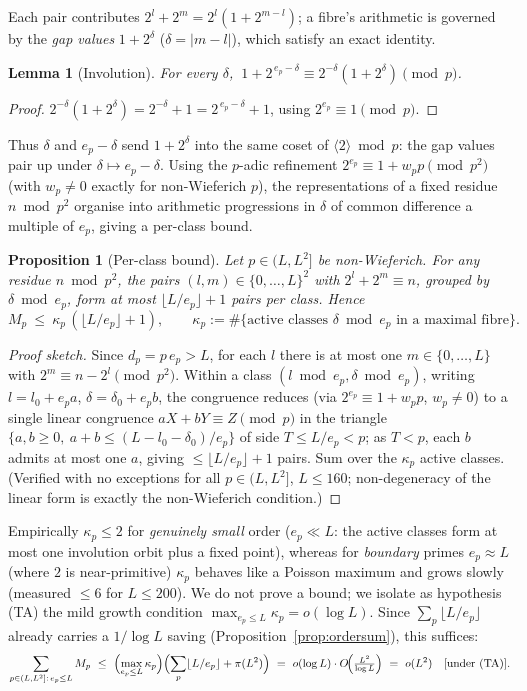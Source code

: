 \documentclass[11pt]{article}
\theoremstyle{plain}
\newtheorem{lemma}[theorem]{Lemma}
\newtheorem{proposition}[theorem]{Proposition}
\theoremstyle{definition}
\theoremstyle{remark}
\newcommand{\dpp}{d_p}
\newcommand{\ep}{e_p}
\begin{document}
Each pair contributes $2^l+2^m=2^l(1+2^{m-l})$; a fibre's arithmetic is governed
by the \emph{gap values} $1+2^\delta$ ($\delta=|m-l|$), which satisfy an exact
identity.

\begin{lemma}[Involution]\label{lem:involution}
For every $\delta$, $\ 1+2^{\,\ep-\delta}\equiv2^{-\delta}(1+2^\delta)\pmod p$.
\end{lemma}
\begin{proof}
$2^{-\delta}(1+2^\delta)=2^{-\delta}+1=2^{\,\ep-\delta}+1$, using $2^{\ep}\equiv1
\pmod p$.
\end{proof}

Thus $\delta$ and $\ep-\delta$ send $1+2^\delta$ into the same coset of
$\langle2\rangle\bmod p$: the gap values pair up under $\delta\mapsto\ep-\delta$.
Using the $p$-adic refinement $2^{\ep}\equiv1+w_pp\pmod{p^2}$ (with $w_p\ne0$
exactly for non-Wieferich $p$), the representations of a fixed residue $n\bmod
p^2$ organise into arithmetic progressions in $\delta$ of common difference a
multiple of $\ep$, giving a per-class bound.

\begin{proposition}[Per-class bound]\label{prop:perclass}
Let $p\in(L,L^2]$ be non-Wieferich. For any residue $n\bmod p^2$, the pairs
$(l,m)\in\{0,\dots,L\}^2$ with $2^l+2^m\equiv n$, grouped by $\delta\bmod\ep$,
form at most $\lfloor L/\ep\rfloor+1$ pairs per class. Hence
\[
M_p\ \le\ \kappa_p\,(\lfloor L/\ep\rfloor+1),\qquad
\kappa_p:=\#\{\text{active classes }\delta\bmod\ep\text{ in a maximal fibre}\}.
\]
\end{proposition}
\begin{proof}[Proof sketch]
Since $\dpp=p\,\ep>L$, for each $l$ there is at most one $m\in\{0,\dots,L\}$ with
$2^m\equiv n-2^l\pmod{p^2}$. Within a class $(l\bmod\ep,\delta\bmod\ep)$, writing
$l=l_0+\ep a$, $\delta=\delta_0+\ep b$, the congruence reduces (via
$2^{\ep}\equiv1+w_pp$, $w_p\ne0$) to a single linear congruence
$aX+bY\equiv Z\pmod p$ in the triangle $\{a,b\ge0,\ a+b\le(L-l_0-\delta_0)/\ep\}$
of side $T\le L/\ep<p$; as $T<p$, each $b$ admits at most one $a$, giving
$\le\lfloor L/\ep\rfloor+1$ pairs. Sum over the $\kappa_p$ active classes.
(Verified with no exceptions for all $p\in(L,L^2]$, $L\le160$; non-degeneracy of
the linear form is exactly the non-Wieferich condition.)
\end{proof}

Empirically $\kappa_p\le2$ for \emph{genuinely small} order ($\ep\ll L$: the
active classes form at most one involution orbit plus a fixed point), whereas for
\emph{boundary} primes $\ep\approx L$ (where $2$ is near-primitive) $\kappa_p$
behaves like a Poisson maximum and grows slowly (measured $\le6$ for $L\le200$).
We do not prove a bound; we isolate as hypothesis (TA) the mild growth condition
$\max_{\ep\le L}\kappa_p=o(\log L)$. Since $\sum_p\lfloor L/\ep\rfloor$ already
carries a $1/\log L$ saving (Proposition~\ref{prop:ordersum}), this suffices:
\[
\sum_{p\in(L,L^2]:\,\ep\le L}M_p\ \le\ \Bigl(\max_{\ep\le L}\kappa_p\Bigr)
\Bigl(\sum_p\lfloor L/\ep\rfloor+\pi(L^2)\Bigr)
\ =\ o(\log L)\cdot O\!\Bigl(\tfrac{L^2}{\log L}\Bigr)\ =\ o(L^2)\quad\text{[under (TA)].}
\]
\end{document}
